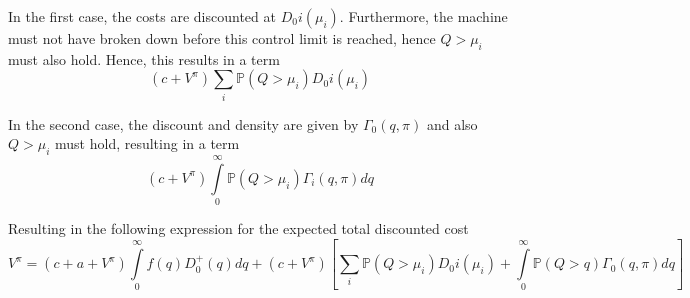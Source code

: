 In the first case, the costs are discounted at $D_0i(\mu_i)$.
Furthermore, the machine must not have broken down before this control limit is reached, hence $Q>\mu_i$ must also hold.
Hence, this results in a term
$$
(c+V^{\pi})\sum\limits_i\mathbb{P}(Q>\mu_i)D_0i(\mu_i)
$$

In the second case, the discount and density are given by $\Gamma_0(q,\pi)$ and also $Q>\mu_i$ must hold, resulting in a term
$$
(c+V^{\pi})\int\limits_0^\infty \mathbb{P}(Q>\mu_i)\Gamma_{i}(q,\pi)dq
$$

Resulting in the following expression for the expected total discounted cost
\begin{equation}
V^\pi=(c+a+V^{\pi})\int\limits_0^\infty f(q)D_0^+(q)dq+(c+V^{\pi})\left[\sum\limits_i\mathbb{P}(Q>\mu_i)D_0i(\mu_i)+\int\limits_0^\infty \mathbb{P}(Q>q)\Gamma_{0}(q,\pi)dq\right]
\end{equation}



